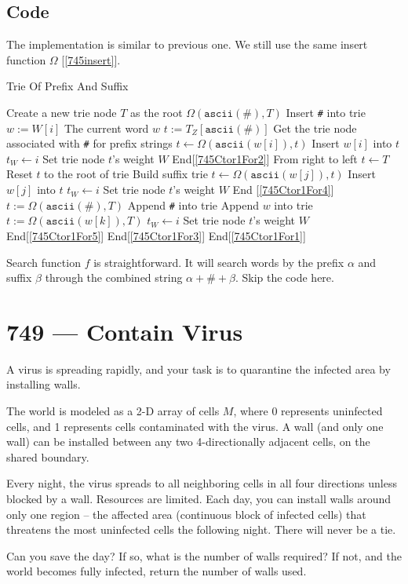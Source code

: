 \documentclass[a4paper,12pt]{article}
\begin{document}
\subsection{Code}
The implementation is similar to previous one. We still use the same insert function $\Omega$ [\ref{745insert}].
\begin{algorithm}[H]
\caption{Trie Of Prefix And Suffix}
\begin{algorithmic}[1]
\State Create a new trie node $T$ as the root
\State $\Omega(\texttt{ascii}(\texttt{\#}), T)$ \Comment Insert \texttt{\#} into trie
 \label{745Ctor1For1}
\State $w:=W[i]$ \Comment The current word $w$
\State $t:=T_Z[\texttt{ascii}(\texttt{\#})]$ \Comment Get the trie node associated with \texttt{\#} for prefix strings
 \label{745Ctor1For2}
\State $t\gets \Omega(\texttt{ascii}(w[i]), t)$ \Comment Insert $w[i]$ into $t$
\State $t_W \gets i$ \Comment Set trie node $t$'s weight $W$
\EndFor \Comment End[\ref{745Ctor1For2}]
 \Comment From right to left \label{745Ctor1For3}
\State $t\gets T$ \Comment Reset $t$ to the root of trie
 \Comment Build suffix trie \label{745Ctor1For4}
\State $t\gets \Omega(\texttt{ascii}(w[j]), t)$ \Comment Insert $w[j]$ into $t$
\State $t_W \gets i$ \Comment Set trie node $t$'s weight $W$
\EndFor \Comment End [\ref{745Ctor1For4}]
\State $t:=\Omega(\texttt{ascii}(\texttt{\#}), T)$ \Comment Append \texttt{\#} into trie
 \Comment Append $w$ into trie \label{745Ctor1For5}
\State $t:=\Omega(\texttt{ascii}(w[k]), T)$ 
\State $t_W \gets i$ \Comment Set trie node $t$'s weight $W$
\EndFor \Comment End[\ref{745Ctor1For5}]
\EndFor \Comment End[\ref{745Ctor1For3}]
\EndFor \Comment End[\ref{745Ctor1For1}]
\EndProcedure
\end{algorithmic}
\end{algorithm}
Search function $f$ is straightforward. It will search words by the prefix $\alpha$ and suffix $\beta$ through the combined string $\alpha + \texttt{\#} + \beta$. Skip the code here. 

\section{749 --- Contain Virus}
A virus is spreading rapidly, and your task is to quarantine the infected area by installing walls.
\par
The world is modeled as a 2-D array of cells $M$, where 0 represents uninfected cells, and 1 represents cells contaminated with the virus. A wall (and only one wall) can be installed between any two 4-directionally adjacent cells, on the shared boundary.
\par
Every night, the virus spreads to all neighboring cells in all four directions unless blocked by a wall. Resources are limited. Each day, you can install walls around only one region -- the affected area (continuous block of infected cells) that threatens the most uninfected cells the following night. There will never be a tie.
\par
Can you save the day? If so, what is the number of walls required? If not, and the world becomes fully infected, return the number of walls used.
\end{document}
